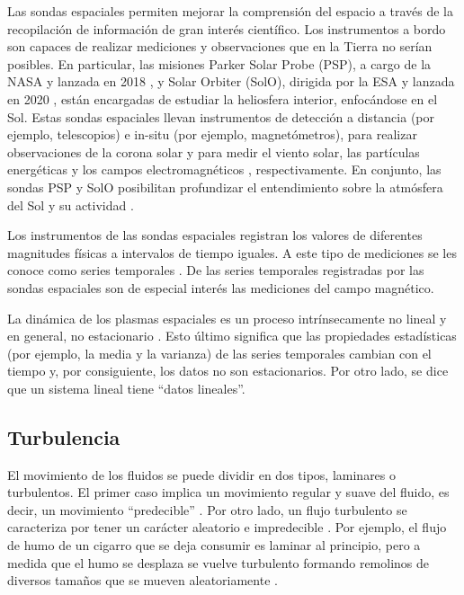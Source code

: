 \noindent Las sondas espaciales permiten mejorar la comprensión del espacio a través de la recopilación de información de gran interés científico. Los instrumentos a bordo son capaces de realizar mediciones y observaciones que en la Tierra no serían posibles. En particular, las misiones Parker Solar Probe (PSP), a cargo de la NASA y lanzada en 2018 \cite{fox_solar_2016}, y Solar Orbiter (SolO), dirigida por la ESA y lanzada en 2020 \cite{muller_solar_2020}, están encargadas de estudiar la heliosfera interior, enfocándose en el Sol. Estas sondas espaciales llevan instrumentos de detección a distancia (por ejemplo, telescopios) e in-situ (por ejemplo, magnetómetros), para realizar observaciones de la corona solar y para medir el viento solar, las partículas energéticas y los campos electromagnéticos \cite{fox_solar_2016, muller_solar_2020}, respectivamente. En conjunto, las sondas PSP y SolO posibilitan profundizar el entendimiento sobre la atmósfera del Sol y su actividad \cite{velli_understanding_2020}. 
    
Los instrumentos de las sondas espaciales registran los valores de diferentes magnitudes físicas a intervalos de tiempo iguales. A este tipo de mediciones se les conoce como series temporales \cite{Priestley, chatfield_analysis_2019}. De las series temporales registradas por las sondas espaciales son de especial interés las mediciones del campo magnético. 

La dinámica de los plasmas espaciales es un proceso intrínsecamente no lineal \cite{Kamide, bruno_turbulence_2016, matthaeus_intermittency_2015} y en general, no estacionario \cite{chatfield_analysis_2019, Priestley, alberti_multifractal_2019}. Esto último significa que las propiedades estadísticas (por ejemplo, la media y la varianza) de las series temporales cambian con el tiempo \cite{chatfield_analysis_2019, Priestley} y, por consiguiente, los datos no son estacionarios. Por otro lado, se dice que un sistema lineal tiene ``datos lineales”.          

\subsection{Turbulencia}

\noindent El movimiento de los fluidos se puede dividir en dos tipos, laminares o turbulentos. El primer caso implica un movimiento regular y suave del fluido, es decir, un movimiento ``predecible'' \cite{Landau, Cengel, davidson_turbulence_2015}. Por otro lado, un flujo turbulento se caracteriza por tener un carácter aleatorio e impredecible \cite{Landau, Cengel, davidson_turbulence_2015}. Por ejemplo, el flujo de humo de un cigarro que se deja consumir es laminar al principio, pero a medida que el humo se desplaza se vuelve turbulento formando remolinos de diversos tamaños que se mueven aleatoriamente \cite{Cengel}. 

